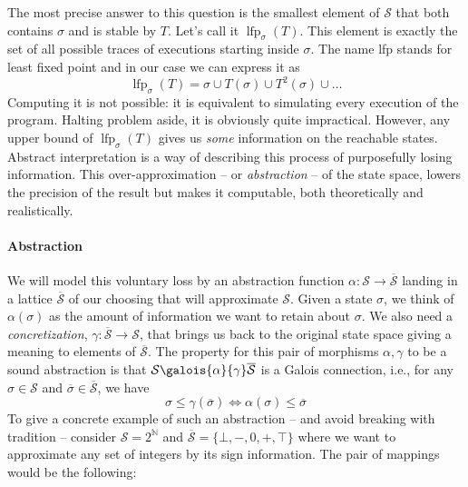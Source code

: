 \documentclass[11pt]{article}
\renewcommand{\S}{\mathcal{S}}
\newcommand{\oS}{\overline{\mathcal{S}}}
\DeclareMathOperator{\lfp}{lfp}
\begin{document}
The most precise answer to this question is the smallest element of $\S$ that both contains $\sigma$ and is stable by $T$. Let's call it $\lfp_\sigma(T)$. This element is exactly the set of all possible traces of executions starting inside $\sigma$. The name lfp stands for least fixed point and in our case we can express it as
\[ \lfp_\sigma(T) = \sigma \cup T(\sigma) \cup T^2(\sigma) \cup \dots \]
Computing it is not possible: it is equivalent to simulating every execution of the program. Halting problem aside, it is obviously quite impractical. However, any upper bound of $\lfp_\sigma(T)$ gives us \emph{some} information on the reachable states. Abstract interpretation is a way of describing this process of purposefully losing information. This over-approximation -- or \emph{abstraction} -- of the state space, lowers the precision of the result but makes it computable, both theoretically and realistically.

\paragraph{Abstraction} We will model this voluntary loss by an abstraction function $\alpha:\S\to\oS$ landing in a lattice $\oS$ of our choosing that will approximate $\S$. Given a state $\sigma$, we think of $\alpha(\sigma)$ as the amount of information we want to retain about $\sigma$. We also need a \emph{concretization}, $\gamma:\oS\to\S$, that brings us back to the original state space giving a meaning to elements of $\oS$.  The property for this pair of morphisms $\alpha,\gamma$ to be a sound abstraction is that $\S\galois{\alpha}{\gamma}\oS$ is a Galois connection, i.e., for any $\sigma\in\S$ and $\overline{\sigma}\in\oS$, we have
\[ \sigma \leq \gamma(\overline{\sigma}) \iff \alpha(\sigma) \leq \overline{\sigma} \]
To give a concrete example of such an abstraction -- and avoid breaking with tradition  -- consider $\S = 2^{\mathbb{N}}$ and $\oS = \{\bot,-,0,+,\top\}$ where we want to approximate any set of integers by its sign information. The pair of mappings  would be the following:
\end{document}
